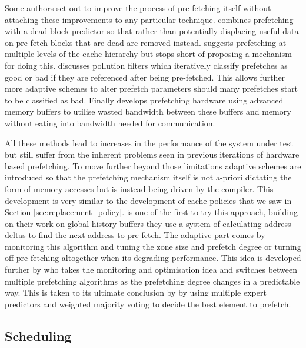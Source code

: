 Some authors set out to improve the process of pre-fetching itself without attaching these improvements to any particular technique. \citet{laiDeadblockPredictionDeadblock2001} combines prefetching with a dead-block predictor so that rather than potentially displacing useful data on pre-fetch blocks that are dead are removed instead. \citet{frittsMultilevelMemoryPrefetching2002} suggests prefetching at multiple levels of the cache hierarchy but stops short of proposing a mechanism for doing this. \citet{zhuangHardwarebasedCachePollution2003} discusses pollution filters which iteratively classify prefetches as good or bad if they are referenced after being pre-fetched. This allows further more adaptive schemes to alter prefetch parameters should many prefetches start to be classified as bad. Finally \citet{linDRAMLevelPrefetchingFullyBuffered2007} develops prefetching hardware using advanced memory buffers to utilise wasted bandwidth between these buffers and memory without eating into bandwidth needed for communication. 

All these methods lead to increases in the performance of the system under test but still suffer from the inherent problems seen in previous iterations of hardware based prefetching. To move further beyond those limitations adaptive schemes are introduced so that the prefetching mechanism itself is not a-priori dictating the form of memory accesses but is instead being driven by the compiler. This development is very similar to the development of cache policies that we saw in Section \ref{sec:replacement_policy}. \citet{nesbitACDCAdaptive2004} is one of the first to try this approach, building on their work on global history buffers \cite{nesbitDataCachePrefetching2004} they use a system of calculating address deltas to find the next address to pre-fetch. The adaptive part comes by monitoring this algorithm and tuning the zone size and prefetch degree or turning off pre-fetching altogether when its degrading performance. This idea is developed further by \citet{aroraCompositeDataPrefetcher2014} who takes the monitoring and optimisation idea and switches between multiple prefetching algorithms as the prefetching degree changes in a predictable way. This is taken to its ultimate conclusion by \citet{pandaExpertPrefetchPrediction2016} by using multiple expert predictors and weighted majority voting to decide the best element to prefetch.

\subsection{Scheduling}

